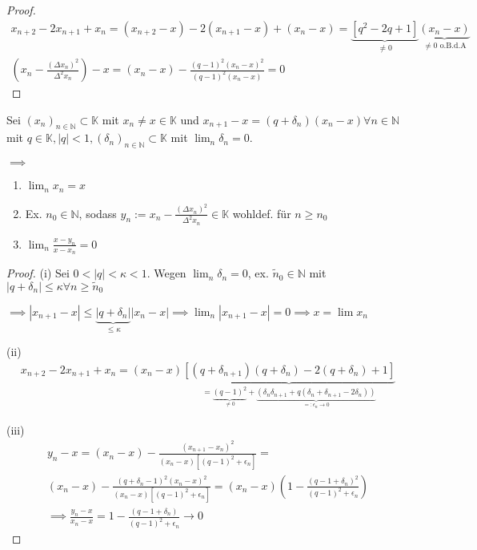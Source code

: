 \begin{proof}
	\begin{align*}
		x_{n+2} - 2x_{n+1} + x_n = (x_{n+2} - x) - 2(x_{n+1} - x) + (x_n - x) = \underbrace{[q^2 - 2q + 1]}_{\neq 0} \underbrace{(x_n - x)}_{\neq 0 \text{ o.B.d.A}}\\
		\left(x_n - \frac{(\Delta x_n)^2}{\Delta^2 x_n}\right)- x = (x_n - x) - \frac{(q-1)^2(x_n - x)^2}{(q-1)^2 (x_n - x)} = 0
	\end{align*}
\end{proof}

\begin{theorem}
	Sei $(x_n)_{n\in \mathbb{N}} \subset \mathbb{K}$ mit $x_n \neq x \in \mathbb{K}$ und $x_{n+1} - x = (q + \delta_n)(x_n - x) \forall n \in \mathbb{N}$ mit $q \in \mathbb{K}, |q| < 1, (\delta_n)_{n\in \mathbb{N}} \subset \mathbb{K}$ mit $\lim_n \delta_n = 0$.
	
	$\implies$ \begin{enumerate}
		\item $\lim_n x_n = x$
		\item Ex. $n_0 \in \mathbb{N}$, sodass $y_n := x_n - \frac{(\Delta x_n)^2}{\Delta^2 x_n} \in \mathbb{K}$ wohldef. für $n \geq n_0$
		\item $\lim_n \frac{x-y_n}{x-x_n} = 0$
	\end{enumerate}
\end{theorem}

\begin{proof}
	(i) Sei $0 < |q| < \kappa < 1$. Wegen $\lim_n \delta_n = 0$, ex. $\tilde{n}_0 \in \mathbb{N}$ mit $|q + \delta_n| \leq \kappa \forall n \geq \tilde{n}_0$
	
	$\implies |x_{n+1} - x| \leq \underbrace{|q + \delta_n|}_{\leq \kappa} |x_n - x| \implies \lim_n |x_{n+1}-x| = 0 \implies x = \lim x_n$
	
	(ii)
	\begin{align*}
		x_{n+2} - 2 x_{n+1} + x_n = (x_n - x) \underbrace{[(q+\delta_{n+1}) (q+\delta_n) - 2(q+\delta_n) + 1]}_{=\underbrace{(q-1)^2}_{\neq 0} + \underbrace{(\delta_n \delta_{n+1} + q(\delta_n + \delta_{n+1} - 2 \delta_n))}_{=: \epsilon_n \rightarrow 0}}
	\end{align*}
	
	(iii)
	\begin{align*}
		y_n - x = (x_n - x) - \frac{(x_{n+1} - x_n)^2}{(x_n - x)[(q-1)^2 + \epsilon_n]} =\\
		(x_n - x) - \frac{(q+\delta_n - 1)^2 (x_n -x)^2}{(x_n - x)[(q-1)^2 + \epsilon_n]} =
		(x_n - x)\left(1 - \frac{(q-1+\delta_n)^2}{(q-1)^2 + \epsilon_n}\right)\\
		\implies \frac{y_n - x}{x_n - x} = 1 - \frac{(q - 1 + \delta_n)}{(q-1)^2 + \epsilon_n} \rightarrow 0
	\end{align*}
\end{proof}

